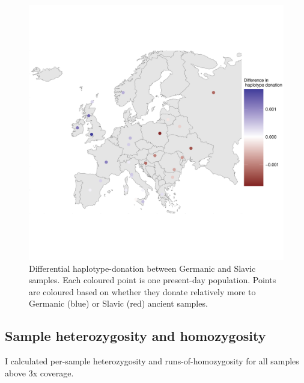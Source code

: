 \begin{figure}[htp]
    \centering
    \includegraphics[width=1.0\textwidth]{../images/chapter4/germanic_slavic_HB_sharing.pdf}
    \caption{Differential haplotype-donation between Germanic and Slavic samples. Each coloured point is one present-day population. Points are coloured based on whether they donate relatively more to Germanic (blue) or Slavic (red) ancient samples.}
    \label{fig:germanic_slavic_HB_sharing}
\end{figure}

\subsection{Sample heterozygosity and homozygosity}

I calculated per-sample heterozygosity and runs-of-homozygosity  for all samples above 3x coverage. 

